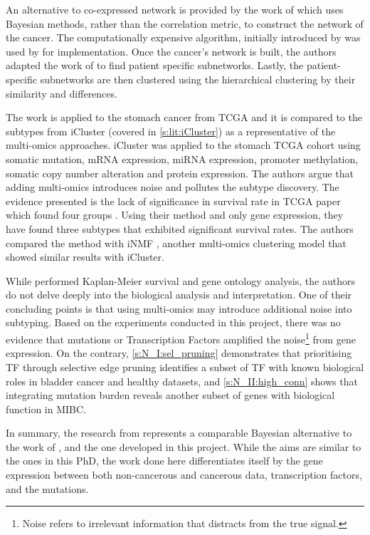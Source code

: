 An alternative to co-expressed network is provided by the work of \citet{Nakazawa2021-yq} which uses Bayesian methods, rather than the correlation metric, to construct the network of the cancer. The computationally expensive algorithm, initially introduced by \citet{Imoto2001-uc} was used by \citet{Tamada2011-ok} for implementation. Once the cancer’s network is built, the authors adapted the work of \citet{Tanaka2020-mw} to find patient specific subnetworks. Lastly, the patient-specific subnetworks are then clustered using the hierarchical clustering by their similarity and differences.

The work is applied to the stomach cancer from TCGA and it is compared to the subtypes from iCluster \citep{Shen2009-ew} (covered in \cref{s:lit:iCluster}) as a representative of the multi-omics approaches. iCluster was applied to the stomach TCGA cohort using somatic mutation, mRNA expression, miRNA expression, promoter methylation, somatic copy number alteration and protein expression. The authors \citet{Nakazawa2021-yq} argue that adding multi-omics introduces noise and pollutes the subtype discovery. The evidence presented is the lack of significance in survival rate in TCGA paper which found four groups \citep{Cancer_Genome_Atlas_Research_Network2014-xp}. Using their method and only gene expression, they have found three subtypes that exhibited significant survival rates. The authors compared the method with iNMF \citep{Yang2016-dm}, another multi-omics clustering model that showed similar results with iCluster.

While \cite{Nakazawa2021-yq} performed Kaplan-Meier survival and gene ontology analysis, the authors do not delve deeply into the biological analysis and interpretation. One of their concluding points is that using multi-omics may introduce additional noise into subtyping. Based on the experiments conducted in this project, there was no evidence that mutations or Transcription Factors amplified the noise\footnote{Noise refers to irrelevant information that distracts from the true signal.} from gene expression. On the contrary, \cref{s:N_I:sel_pruning} demonstrates that prioritising TF through selective edge pruning identifies a subset of TF with known biological roles in bladder cancer and healthy datasets, and \cref{s:N_II:high_conn} shows that integrating mutation burden reveals another subset of genes with biological function in MIBC.


In summary, the research from \citet{Nakazawa2021-yq} represents a comparable Bayesian alternative to the work of \citet{Care2019-ij}, and the one developed in this project. While the aims are similar to the ones in this PhD, the work done here differentiates itself by the gene expression between both non-cancerous and cancerous data, transcription factors, and the mutations.



